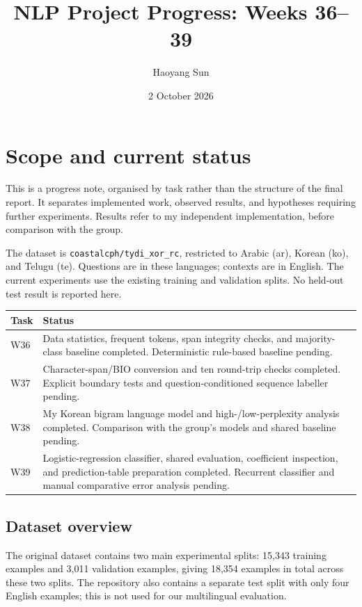 \documentclass[11pt,a4paper]{article}
\title{NLP Project Progress: Weeks 36--39}
\author{Haoyang Sun}
\date{2 October 2026}
\begin{document}
\maketitle

\section{Scope and current status}
This is a progress note, organised by task rather than the structure of the final report. It separates implemented work, observed results, and hypotheses requiring further experiments. Results refer to my independent implementation, before comparison with the group.

The dataset is \texttt{coastalcph/tydi\_xor\_rc}, restricted to Arabic (ar), Korean (ko), and Telugu (te). Questions are in these languages; contexts are in English. The current experiments use the existing training and validation splits. No held-out test result is reported here.

\begin{center}
\begin{tabularx}{\linewidth}{lX}
\toprule
Task & Status \\
\midrule
W36 & Data statistics, frequent tokens, span integrity checks, and majority-class baseline completed. Deterministic rule-based baseline pending. \\
W37 & Character-span/BIO conversion and ten round-trip checks completed. Explicit boundary tests and question-conditioned sequence labeller pending. \\
W38 & My Korean bigram language model and high-/low-perplexity analysis completed. Comparison with the group's models and shared baseline pending. \\
W39 & Logistic-regression classifier, shared evaluation, coefficient inspection, and prediction-table preparation completed. Recurrent classifier and manual comparative error analysis pending. \\
\bottomrule
\end{tabularx}
\end{center}

\subsection*{Dataset overview}

The original dataset contains two main experimental splits:
15,343 training examples and 3,011 validation examples,
giving 18,354 examples in total across these two splits.
The repository also contains a separate test split with only
four English examples; this is not used for our multilingual
evaluation.
\end{document}
